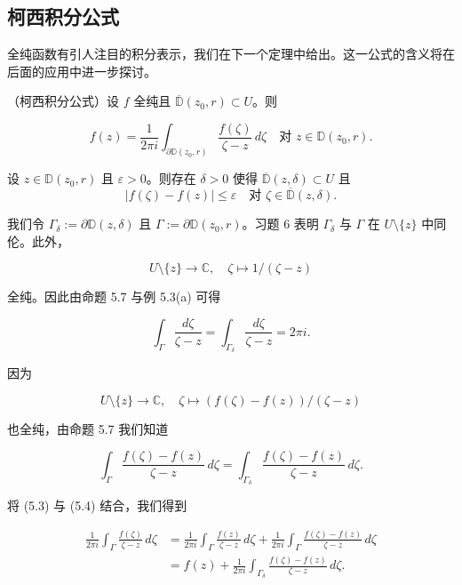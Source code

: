 \subsection*{柯西积分公式}

全纯函数有引人注目的积分表示，我们在下一个定理中给出。这一公式的含义将在后面的应用中进一步探讨。

\begin{theorem}

（柯西积分公式）设 $ f $ 全纯且 $ \overline{\mathbb{D}}(z_{0},r) \subset U $。则

\[
f(z) = \frac{1}{2\pi i}\int_{\partial\mathbb{D}(z_{0},r)}\frac{f(\zeta)}{\zeta - z}\,d\zeta \quad \text{对 } z \in \mathbb{D}(z_{0},r) .
\]

\proofhead
设 $ z \in \mathbb{D}(z_{0},r) $ 且 $ \varepsilon > 0 $。则存在 $ \delta > 0 $ 使得 $ \overline{\mathbb{D}}(z,\delta) \subset U $ 且
\begin{equation}
|f(\zeta) - f(z)| \le \varepsilon \quad \text{对 } \zeta \in \overline{\mathbb{D}}(z,\delta) .\tag{5.2}
\end{equation}

我们令 $ \Gamma_{\delta} := \partial\mathbb{D}(z,\delta) $ 且 $ \Gamma := \partial\mathbb{D}(z_{0},r) $。习题 6 表明 $ \Gamma_{\delta} $ 与 $ \Gamma $ 在 $ U\setminus\{z\} $ 中同伦。此外，

\[
U\setminus\{z\} \to \mathbb{C} , \quad \zeta \mapsto 1/(\zeta - z)
\]

全纯。因此由命题 5.7 与例 5.3(a) 可得

\begin{equation}
\int_{\Gamma}\frac{d\zeta}{\zeta - z} = \int_{\Gamma_{\delta}}\frac{d\zeta}{\zeta - z} = 2\pi i .\tag{5.3}
\end{equation}

因为

\[
U\setminus\{z\} \to \mathbb{C} , \quad \zeta \mapsto (f(\zeta) - f(z))/(\zeta - z)
\]

也全纯，由命题 5.7 我们知道

\begin{equation}
\int_{\Gamma}\frac{f(\zeta) - f(z)}{\zeta - z}\,d\zeta = \int_{\Gamma_{\delta}}\frac{f(\zeta) - f(z)}{\zeta - z}\,d\zeta .\tag{5.4}
\end{equation}

将 (5.3) 与 (5.4) 结合，我们得到

\begin{equation*}
\begin{aligned}
\frac{1}{2\pi i}\int_{\Gamma}\frac{f(\zeta)}{\zeta - z}\,d\zeta &= \frac{1}{2\pi i}\int_{\Gamma}\frac{f(z)}{\zeta - z}\,d\zeta + \frac{1}{2\pi i}\int_{\Gamma}\frac{f(\zeta) - f(z)}{\zeta - z}\,d\zeta \\ &= f(z) + \frac{1}{2\pi i}\int_{\Gamma_{\delta}}\frac{f(\zeta) - f(z)}{\zeta - z}\,d\zeta .
\end{aligned}
\end{equation*}


\end{theorem}
